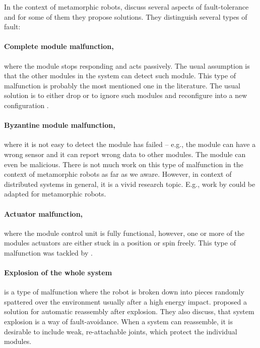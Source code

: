 In the context of metamorphic robots, \textcite{DKbotDistr} discuss several
aspects of fault-tolerance and for some of them they propose solutions. They
distinguish several types of fault:

\paragraph{Complete module malfunction,} where the module stops responding and
acts passively. The usual assumption is that the other modules in the system can
detect such module. This type of malfunction is probably the most mentioned one
in the literature. The usual solution is to either drop or to ignore such
modules and reconfigure into a new configuration
\cite{DBLP:conf/ieeealife/Christensen07, DMotionCoord}.

\paragraph{Byzantine module malfunction,} where it is not easy to detect the
module has failed -- e.g., the module can have a wrong sensor and it can report
wrong data to other modules. The module can even be malicious. There is not much
work on this type of malfunction in the context of metamorphic robots as far as
we aware. However, in context of distributed systems in general, it is a vivid
research topic. E.g., work by \textcite{DBLP:conf/osdi/CastroL99} could be
adapted for metamorphic robots.

\paragraph{Actuator malfunction,} where the module control unit is fully
functional, however, one or more of the modules actuators are either stuck
in a position or spin freely. This type of malfunction was tackled by
\textcite{DBLP:conf/romoco/VonasekONW15}.

\paragraph{Explosion of the whole system} is a type of malfunction where the
robot is broken down into pieces randomly spattered over the environment usually
after a high energy impact. \textcite{DBLP:conf/iros/YimSSPDT07a} proposed a
solution for automatic reassembly after explosion. They also discuss, that
system explosion is a way of fault-avoidance. When a system can reassemble, it
is desirable to include weak, re-attachable joints, which protect the individual
modules.

